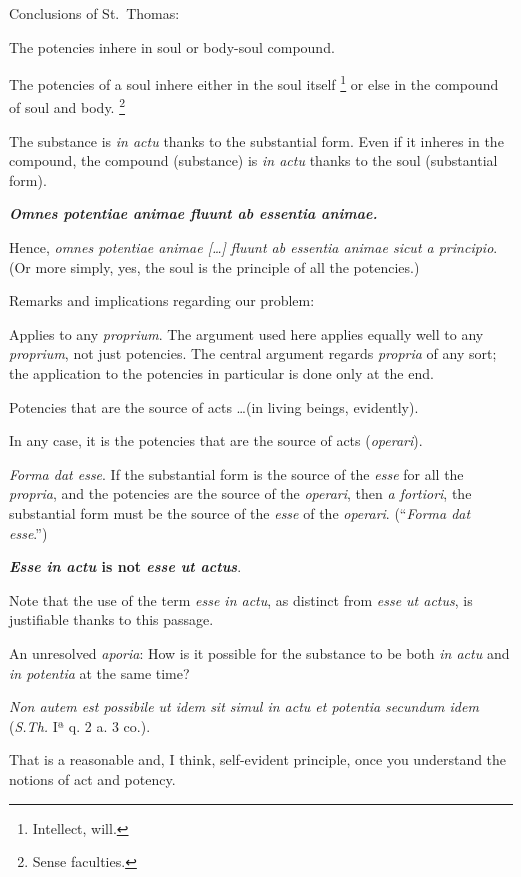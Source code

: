 \begin{DONE}
Conclusions of St.~Thomas:

The potencies inhere in soul or body-soul compound.

The potencies of a soul inhere either in the soul itself%
%
\footnote{Intellect, will.} or else in the compound of soul and body.%
%
\footnote{Sense faculties.}

The substance is \emph{in actu} thanks to the substantial form.
Even if it inheres in the compound, the compound (substance) is \emph{in actu} thanks to the soul (substantial form).

\emph{\textbf{Omnes potentiae animae fluunt ab essentia animae.}}

Hence, \emph{omnes potentiae animae [\ldots] fluunt ab essentia animae sicut a principio}. (Or more simply, yes, the soul is the principle of all the potencies.)

Remarks and implications regarding our problem:

Applies to any \emph{proprium}.
The argument used here applies equally well to any \emph{proprium}, not just potencies. The central argument regards \emph{propria} of any sort; the application to the potencies in particular is done only at the end.

Potencies that are the source of acts \ldots (in living beings, evidently).

In any case, it is the potencies that are the source of acts (\emph{operari}).

\emph{Forma dat esse}.
If the substantial form is the source of the \emph{esse} for all the \emph{propria}, and the potencies are the source of the   \emph{operari}, then \emph{a fortiori}, the substantial form must be the source of the \emph{esse} of the   \emph{operari}. (\enquote{\emph{Forma dat esse}.})

\textbf{\emph{Esse in actu} is not \emph{esse ut actus}}.

Note that the use of the term \emph{esse in actu}, as distinct from \emph{esse ut actus}, is justifiable thanks to this passage.

An unresolved \emph{aporia}:
How is it possible for the substance to be both \emph{in actu} and \emph{in potentia} at the same time?

\emph{Non autem est possibile ut idem sit simul in actu et potentia secundum idem} (\emph{S.Th.} Iª q. 2 a. 3 co.).

That is a reasonable and, I think, self-evident principle, once you understand the notions of act and potency.


\end{DONE}
